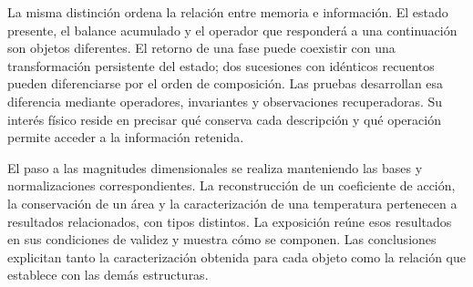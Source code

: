 La misma distinción ordena la relación entre memoria e información. El
estado presente, el balance acumulado y el operador que responderá a una
continuación son objetos diferentes. El retorno de una fase puede coexistir
con una transformación persistente del estado; dos sucesiones con idénticos
recuentos pueden diferenciarse por el orden de composición. Las pruebas
desarrollan esa diferencia mediante operadores, invariantes y observaciones
recuperadoras. Su interés físico reside en precisar qué conserva cada
descripción y qué operación permite acceder a la información retenida.

El paso a las magnitudes dimensionales se realiza manteniendo las bases y
normalizaciones correspondientes. La reconstrucción de un coeficiente de
acción, la conservación de un área y la caracterización de una temperatura
pertenecen a resultados relacionados, con tipos distintos. La exposición
reúne esos resultados en sus condiciones de validez y muestra cómo se
componen. Las conclusiones explicitan tanto la caracterización obtenida
para cada objeto como la relación que establece con las demás estructuras.
